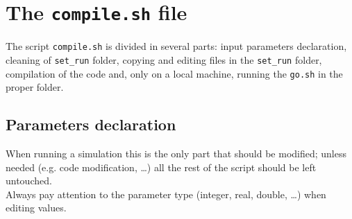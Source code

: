\section{The \texttt{compile.sh} file}
\label{sec: compile}
The script \texttt{compile.sh} is divided in several parts: input parameters declaration, cleaning of \texttt{set\_run} folder, copying and editing files in the \texttt{set\_run} folder, compilation of the code and, only on a local machine, running the \texttt{go.sh} in the proper folder.

\subsection{Parameters declaration}
When running a simulation this is the only part that should be modified; unless needed (e.g. code modification, \dots) all the rest of the script should be left untouched.\\
Always pay attention to the parameter type (integer, real, double, \dots) when editing values.
